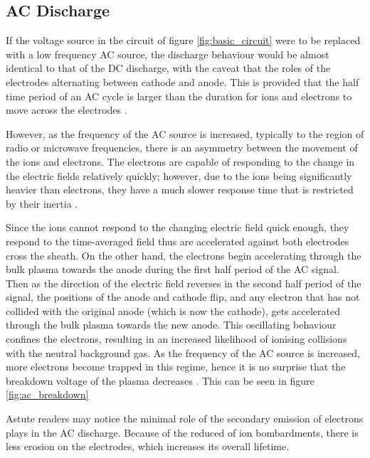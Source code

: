 \subsection{AC Discharge}

If the voltage source in the circuit of figure \ref{fig:basic_circuit} were to be replaced with a low frequency AC source, the discharge behaviour would be almost identical to that of the DC discharge, with the caveat that the roles of the electrodes alternating between cathode and anode. This is provided that the half time period of an AC cycle is larger than the duration for ions and electrons to move across the electrodes \cite{Bogaerts2002}.

However, as the frequency of the AC source is increased, typically to the region of radio or microwave frequencies, there is an asymmetry between the movement of the ions and electrons. The electrons are capable of responding to the change in the electric fields relatively quickly; however, due to the ions being significantly heavier than electrons, they have a much slower response time that is restricted by their inertia \cite{Chabert2011}.

Since the ions cannot respond to the changing electric field quick enough, they respond to the time-averaged field thus are accelerated against both electrodes cross the sheath. On the other hand, the electrons begin accelerating through the bulk plasma towards the anode during the first half period of the AC signal. Then as the direction of the electric field reverses in the second half period of the signal, the positions of the anode and cathode flip, and any electron that has not collided with the original anode (which is now the cathode), gets accelerated through the bulk plasma towards the new anode. This oscillating behaviour confines the electrons, resulting in an increased likelihood of ionising collisions with the neutral background gas. As the frequency of the AC source is increased, more electrons become trapped in this regime, hence it is no surprise that the breakdown voltage of the plasma decreases \cite{Chu1992}. This can be seen in figure \ref{fig:ac_breakdown}

Astute readers may notice the minimal role of the secondary emission of electrons plays in the AC discharge. Because of the reduced of ion bombardments, there is less erosion on the electrodes, which increases its overall lifetime. 

